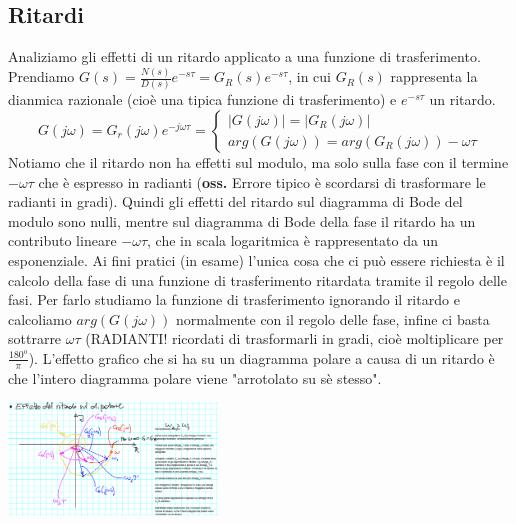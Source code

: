 \begin{landscape}
    \subsection*{Ritardi}
    Analiziamo gli effetti di un ritardo applicato a una funzione di trasferimento. Prendiamo $G(s) = \frac{N(s)}{D(s)} e^{-s \tau} = G_R(s) e^{-s \tau}$, in cui $G_R(s)$ rappresenta la dianmica razionale (cioè una tipica funzione di trasferimento) e $e^{-s \tau}$ un ritardo.
        \[
            G(j \omega) = G_r(j \omega) e^{- j \omega \tau} = \begin{cases}
                |G(j \omega)| = |G_R(j \omega)|\\
                arg(G(j \omega)) = arg(G_R(j \omega)) - \omega \tau
            \end{cases}
        \]
        Notiamo che il ritardo non ha effetti sul modulo, ma solo sulla fase con il termine $- \omega \tau$ che è espresso in radianti (\textbf{oss.} Errore tipico è scordarsi di trasformare le radianti in gradi).\newline
        Quindi gli effetti del ritardo sul diagramma di Bode del modulo sono nulli, mentre sul diagramma di Bode della fase il ritardo ha un contributo lineare $- \omega \tau$, che in scala logaritmica è rappresentato da un esponenziale.\newline
        \newline
        Ai fini pratici (in esame) l'unica cosa che ci può essere richiesta è il calcolo della fase di una funzione di trasferimento ritardata tramite il regolo delle fasi. Per farlo studiamo la funzione di trasferimento ignorando il ritardo e calcoliamo $arg(G(j \omega))$ normalmente con il regolo delle fase, infine ci basta sottrarre $\omega \tau$ (RADIANTI! ricordati di trasformarli in gradi, cioè moltiplicare per $\frac{180^o}{\pi}$). \newline
        \newline
        L'effetto grafico che si ha su un diagramma polare a causa di un ritardo è che l'intero diagramma polare viene "arrotolato su sè stesso".
        \begin{center}
            \includegraphics[height=3cm]{../lezione17/img2.PNG}

\end{center}
\end{landscape}
